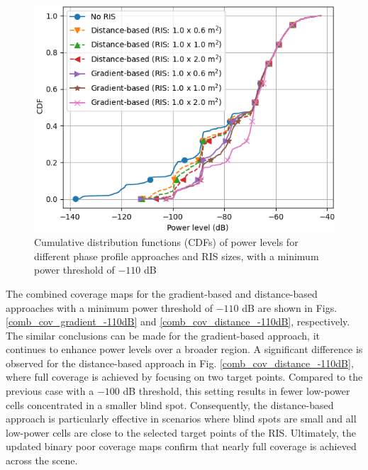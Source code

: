 \documentclass{IEEEoj}
\begin{document}
\begin{figure}
	\centering \includegraphics[width=\linewidth]{Sim_Results/CDF_-110dB.png}
	\caption{Cumulative distribution functions (CDFs) of power levels for different phase profile approaches and RIS sizes, with a minimum power threshold of $-110$ dB}
	\label{CDF_-110dB}
\end{figure}

The combined coverage maps for the gradient-based and distance-based approaches with a minimum power threshold of $-110$ dB are shown in Figs. \ref{comb_cov_gradient_-110dB} and \ref{comb_cov_distance_-110dB}, respectively. The similar conclusions can be made for the gradient-based approach, it continues to enhance power levels over a broader region. A significant difference is observed for the distance-based approach in Fig. \ref{comb_cov_distance_-110dB}, where full coverage is achieved by focusing on two target points. Compared to the previous case with a $-100$ dB threshold, this setting results in fewer low-power cells concentrated in a smaller blind spot. Consequently, the distance-based approach is particularly effective in scenarios where blind spots are small and all low-power cells are close to the selected target points of the RIS. Ultimately, the updated binary poor coverage maps confirm that nearly full coverage is achieved across the scene.
\end{document}
